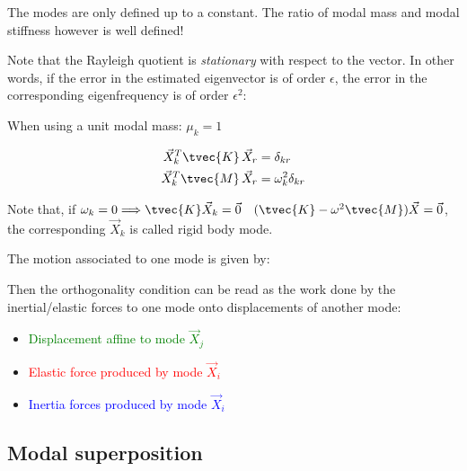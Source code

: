 \documentclass[10pt,a4paper]{scrartcl}
\begin{document}
\begin{multicols*}{2}
The modes are only defined up to a constant. The ratio of modal mass and modal stiffness however is well defined!


Note that the Rayleigh quotient is \emph{stationary} with respect to the vector. In other words, if the error in the estimated eigenvector is of order $\epsilon$, the error in the corresponding eigenfrequency is of order $\epsilon^2$:


When using a unit modal mass: $\mu_k = 1$

\begin{align*}
\vec{X}_k^T\tvec{K}\,\vec{X}_r &= \delta_{kr}\\
\vec{X}_k^T\tvec{M}\,\vec{X}_r&=\omega_k^2\delta_{kr}
\end{align*}

Note that, if $\omega_k = 0\Longrightarrow \tvec{K}\vec{X}_k=\vec{0}\quad (\tvec{K}-\omega^2\tvec{M})\vec{X}=\vec{0}$, the corresponding $\vec{X}_k$ is called rigid body mode.

The motion associated to one mode is given by:


Then the orthogonality condition can be read as the work done by the inertial/elastic forces to one mode onto displacements of another mode:


\begin{itemize}
\item \textcolor{green}{Displacement affine to mode $\vec{X}_j$}
\item \textcolor{red}{Elastic force produced by mode $\vec{X}_i$}
\item \textcolor{blue}{Inertia forces produced by mode $\vec{X}_i$}
\end{itemize}

\subsection{Modal superposition}


\end{multicols*}
\end{document}
